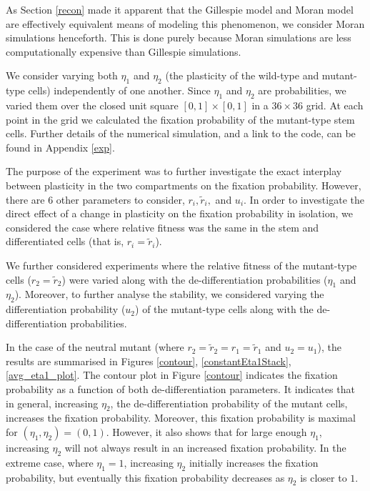\documentclass[12pt]{article}
\begin{document}
As Section \ref{recon} made it apparent that the Gillespie model and Moran model are effectively equivalent means of modeling this phenomenon, we consider Moran simulations henceforth. This is done purely because Moran simulations are less computationally expensive than Gillespie simulations.

We consider varying both $\eta_1$ and $\eta_2$ (the plasticity of the wild-type and mutant-type cells) independently of one another. Since $\eta_1$ and $\eta_2$ are probabilities, we varied them over the closed unit square $[0,1]\times[0,1]$ in a $36\times36$ grid. At each point in the grid we calculated the fixation probability of the mutant-type stem cells. Further details of the numerical simulation, and a link to the code, can be found in Appendix \ref{exp}. 

The purpose of the experiment was to further investigate the exact interplay between plasticity in the two compartments on the fixation probability. However, there are 6 other parameters to consider,  $r_i, \tilde{r}_i,$ and $u_i$. In order to investigate the direct effect of a change in plasticity on the fixation probability in isolation, we considered the case where relative fitness was the same in the stem and differentiated cells (that is, $r_i=\tilde{r}_i$).

We further considered experiments where the relative fitness of the mutant-type cells ($r_2=\tilde{r}_2$) were varied along with the de-differentiation probabilities ($\eta_1$ and $\eta_2$). Moreover, to further analyse the stability, we considered varying the differentiation probability ($u_2$) of the mutant-type cells along with the de-differentiation probabilities.

In the case of the neutral mutant (where $r_2=\tilde{r}_2=r_1=\tilde{r}_1$ and $u_2=u_1$), the results are summarised in Figures \ref{contour}, \ref{constantEta1Stack}, \ref{avg_eta1_plot}. The contour plot in Figure \ref{contour} indicates the fixation probability as a function of both de-differentiation parameters. It indicates that in general, increasing $\eta_2$, the de-differentiation probability of the mutant cells, increases the fixation probability. Moreover, this fixation probability is maximal for $(\eta_1, \eta_2) = (0, 1)$. However, it also shows that for large enough $\eta_1$, increasing $\eta_2$ will not always result in an increased fixation probability. In the extreme case, where $\eta_1=1$, increasing $\eta_2$ initially increases the fixation probability, but eventually this fixation probability decreases as $\eta_2$ is closer to $1$.
\end{document}

